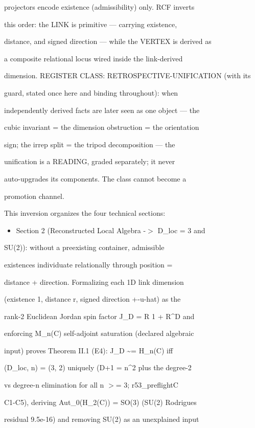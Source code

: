 \documentclass[11pt,a4paper]{article}
\theoremstyle{definition}
\begin{document}
projectors encode existence (admissibility) only. RCF inverts

this order: the LINK is primitive — carrying existence,

distance, and signed direction — while the VERTEX is derived as

a composite relational locus wired inside the link-derived

dimension. REGISTER CLASS: RETROSPECTIVE-UNIFICATION (with its

guard, stated once here and binding throughout): when

independently derived facts are later seen as one object — the

cubic invariant = the dimension obstruction = the orientation

sign; the irrep split = the tripod decomposition — the

unification is a READING, graded separately; it never

auto-upgrades its components. The class cannot become a

promotion channel.


This inversion organizes the four technical sections:

\begin{itemize}[leftmargin=1.4em]
\item Section 2 (Reconstructed Local Algebra -$>$ D\_loc = 3 and
\end{itemize}
    SU(2)): without a preexisting container, admissible

    existences individuate relationally through position =

    distance + direction. Formalizing each 1D link dimension

    (existence 1, distance r, signed direction +-u-hat) as the

    rank-2 Euclidean Jordan spin factor J\_D = R 1 + R\^{}D and

    enforcing M\_n(C) self-adjoint saturation (declared algebraic

    input) proves Theorem II.1 (E4): J\_D \textasciitilde{}= H\_n(C) iff

    (D\_loc, n) = (3, 2) uniquely (D+1 = n\^{}2 plus the degree-2

    vs degree-n elimination for all n $>$= 3; r53\_preflightC

    C1-C5), deriving Aut\_0(H\_2(C)) = SO(3) (SU(2) Rodrigues

    residual 9.5e-16) and removing SU(2) as an unexplained input
\end{document}
